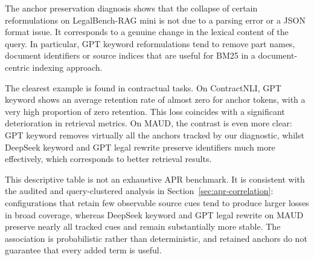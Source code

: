 \documentclass[a4paper,fleqn]{cas-dc}
\begin{document}
The anchor preservation diagnosis shows that
the collapse of certain reformulations on
LegalBench-RAG mini is not due to a
parsing error or a JSON format issue. It corresponds
to a genuine change in the lexical content of the
query. In particular, GPT keyword reformulations
tend to remove part names,
document identifiers or source indices that
are useful for BM25 in a
document-centric indexing approach.


The clearest example is found in contractual
tasks. On ContractNLI, GPT keyword shows
an average retention rate of almost zero for anchor tokens,
with a very high proportion of zero retention. This loss
coincides with a significant deterioration in
retrieval metrics. On MAUD, the contrast is even more
clear: GPT keyword removes virtually all the
anchors tracked by our diagnostic, whilst
DeepSeek keyword and GPT legal rewrite preserve
identifiers much more effectively, which corresponds to
better retrieval results.

\begin{table}[h]
\centering
\caption{Examples from the final conservative anchor-preservation
proxy on LegalBench-RAG mini. Retention values are means within the
specified task and reformulation condition; retrieval columns report
mean deltas relative to the original-query BM25 baseline.}
\label{tab:anchor-retention-diagnostic}
\end{table}

This descriptive table is not an exhaustive APR benchmark. It is
consistent with the audited and query-clustered analysis in
Section~\ref{sec:apr-correlation}: configurations that retain few
observable source cues tend to produce larger losses in broad coverage,
whereas DeepSeek keyword and GPT legal rewrite on MAUD preserve nearly
all tracked cues and remain substantially more stable. The association
is probabilistic rather than deterministic, and retained anchors do not
guarantee that every added term is useful.
\end{document}
